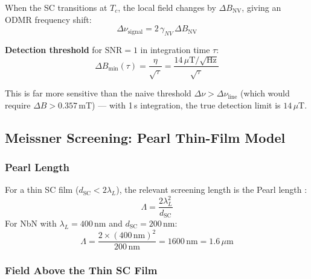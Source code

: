 When the SC transitions at $T_c$, the local field changes by $\Delta B_\text{NV}$,
giving an ODMR frequency shift:
\begin{equation}
  \Delta\nu_\text{signal} = 2\,\gamma_{NV}\,\Delta B_\text{NV}
  \label{eq:oq1_shift}
\end{equation}

\textbf{Detection threshold} for $\text{SNR} = 1$ in integration time $\tau$:
\begin{equation}
  \Delta B_\text{min}(\tau) = \frac{\eta}{\sqrt{\tau}}
  = \frac{14\,\mu\text{T}/\sqrt{\text{Hz}}}{\sqrt{\tau}}
  \label{eq:oq1_threshold}
\end{equation}

This is far more sensitive than the naive threshold $\Delta\nu > \Delta\nu_\text{line}$
(which would require $\Delta B > 0.357$\,mT) --- with 1\,s integration, the true
detection limit is $14\,\mu$T.

\subsection{Meissner Screening: Pearl Thin-Film Model}
\label{sec:oq1_pearl}

\subsubsection{Pearl Length}

For a thin SC film ($d_\text{SC} < 2\lambda_L$), the relevant screening length
is the Pearl length \cite{Pearl1964}%
:
\begin{equation}
  \Lambda = \frac{2\lambda_L^2}{d_\text{SC}}
  \label{eq:oq1_pearl}
\end{equation}
For NbN with $\lambda_L = 400$\,nm and $d_\text{SC} = 200$\,nm:
\begin{equation}
  \Lambda = \frac{2 \times (400\,\text{nm})^2}{200\,\text{nm}} = 1600\,\text{nm} = 1.6\,\mu\text{m}
\end{equation}

\subsubsection{Field Above the Thin SC Film}

